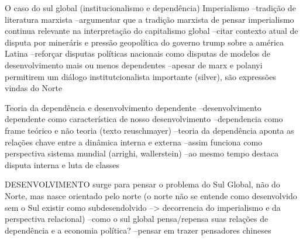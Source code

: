 O caso do sul global (institucionalismo e dependência)
Imperialismo
--tradição de literatura marxista
--argumentar que a tradição marxista de pensar imperialismo continua relevante na interpretação do capitalismo global
--citar contexto atual de disputa por mineráris e pressão geopolítica do governo trump sobre a américa Latina
--reforçar disputas políticas nacionais como disputas de modelos de desenvolvimento mais ou menos dependentes
--apesar de marx e polanyi permitirem um diálogo institutcionalista importante (silver), são expressões vindas do Norte


Teoria da dependência e desenvolvimento dependente
--desenvolvimento dependente como característica de nosso desenvolvimento
--dependencia como frame teórico e não teoria (texto reuschmayer)
--teoria da dependência aponta as relações chave entre a dinâmica interna e externa
--assim funciona como perspectiva sistema mundial (arrighi, wallerstein)
--ao mesmo tempo destaca disputa interna e luta de classes


DESENVOLVIMENTO surge para pensar o problema do Sul Global, não do Norte, mas nasce orientado pelo norte (o norte não se entende como desenvolvido sem o Sul existir como subdesendolvido --> decorrencia do imperialismo e da perspectiva relacional)
--como o sul global pensa/repensa suas relações de dependência e a economia política?
--pensar em trazer pensadores chineses


